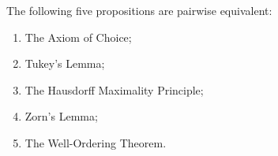 The following five propositions are pairwise equivalent:
\begin{enumerate}
\item[(i)] The Axiom of Choice;
\item[(ii)] Tukey's Lemma;
\item[(iii)] The Hausdorff Maximality Principle;
\item[(iv)] Zorn's Lemma;
\item[(v)] The Well-Ordering Theorem.
\end{enumerate}